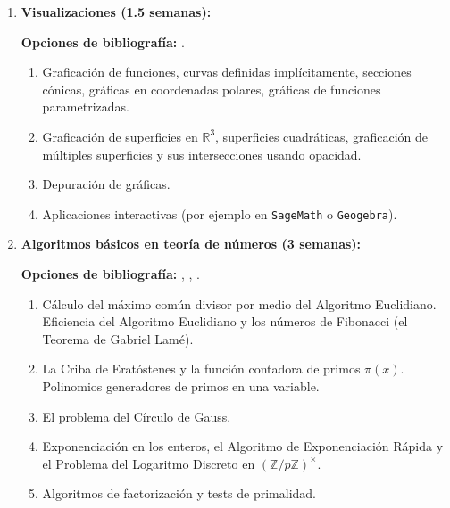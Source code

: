 \begin{refsection}
\begin{enumerate}
\begin{enumerate} 
    \item Problemas y algoritmos.
    \item Pseudocódigos.
    \item Complejidad.
    \item Algoritmos iterativos y recursivos.
    \item Búsquedas.
    \item Ordenamientos.
    \item Árboles binarios.
\end{enumerate}

\item \textbf{Visualizaciones (1.5 semanas):}

\textbf{Opciones de bibliografía:} \cite{Mez15}.

\begin{enumerate} 
    \item Graficación de funciones, curvas definidas implícitamente, secciones cónicas, gráficas en coordenadas polares, gráficas de funciones parametrizadas. 
    \item Graficación de superficies en $\mathbb{R}^3$, superficies cuadráticas, graficación de múltiples superficies y sus intersecciones usando opacidad.
    \item Depuración de gráficas. %
    \item Aplicaciones interactivas (por ejemplo en \texttt{SageMath} o \texttt{Geogebra}).
\end{enumerate}

\item \textbf{Algoritmos básicos en teoría de números (3 semanas):}

\textbf{Opciones de bibliografía:} \cite{Hut18}, \cite{BuhlerWagon2008}, \cite[Capítulo 12]{BRR15}.


\begin{enumerate} 
    \item Cálculo del máximo común divisor por medio del Algoritmo Euclidiano. Eficiencia del Algoritmo Euclidiano y los números de Fibonacci (el Teorema de Gabriel Lamé).
    \item La Criba de Eratóstenes y la función contadora de primos $\pi(x)$. Polinomios generadores de primos en una variable.
    \item El problema del Círculo de Gauss.
    \item Exponenciación en los enteros, el Algoritmo de Exponenciación Rápida y el Problema del Logaritmo Discreto en $(\mathbb{Z}/p\mathbb{Z})^{\times}$.
    \item Algoritmos de factorización y tests de primalidad.
\end{enumerate}


\end{enumerate}
\end{refsection}
